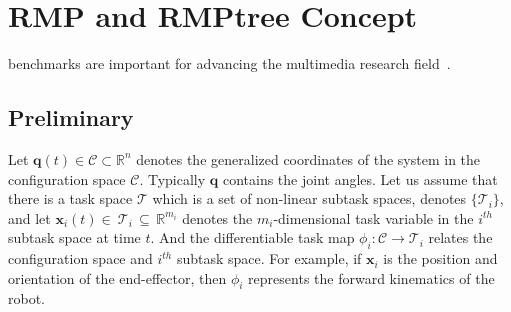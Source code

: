\chapter{RMP and RMPtree Concept}
\label{c:intro}

%
benchmarks are important for advancing the multimedia research
field~\cite{Rowe:2005:ASR}.

\section{Preliminary}

Let $\mathbf{q}(t) \in \mathcal{C}  \subset \mathbb{R}^{n}$  denotes the generalized coordinates of the system in the configuration space $ \mathcal{C}$. Typically $\mathbf{q}$ contains the joint angles. 
Let us assume that there is a task space $\mathcal{T}$ which is a set of non-linear subtask spaces, denotes $\{\mathcal{T}_i\}$, and let $\mathbf{x}_i(t) \in \ \mathcal{T}_{i} \, \subseteq \, \mathbb{R}^{m_i}$ denotes the $m_i$-dimensional task variable in the $i^{th}$  subtask space at time $t$.
And the differentiable task map $\phi_i : \mathcal{C} \rightarrow \mathcal{T}_i $ relates the configuration space and $i^{th}$ subtask space. For example, if $\mathbf{x}_{i}$ is the position and orientation of the end-effector, then $\phi_{i}$ represents the forward kinematics of the robot.

